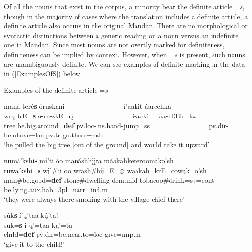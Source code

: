 Of all the nouns that exist in the corpus, a minority bear the definite article =\textit{s}, though in the majority of cases where the translation includes a definite article, a definite article also occurs in the original Mandan. There are no morphological or syntactic distinctions between a generic reading on a noun versus an indefinite one in Mandan. Since most nouns are not overtly marked for definiteness, definiteness can be implied by context. However, when =\textit{s} is present, such nouns are unambiguously definite. We can see examples of definite marking in the data in (\ref{ExamplesOfS}) below.

\begin{exe}

\item\label{ExamplesOfS} Examples of the definite article =\textit{s}

\begin{xlist}

\item\label{ExamplesOfS1} \glll maná teré\textbf{s} óruskani ~ ~ ~ ~ ~ ~ ~ ~ ~ ~ í'aakit áareehka\\
    wrą trE=\textbf{s} o-ru-skE=rį ~ ~ ~ ~ ~ ~ ~ ~ ~ ~ i-aaki=t aa-rEEh=ka\\
    \textnormal{tree} \textnormal{be.big.around}=\textbf{def} pv.loc-ins.hand-\textnormal{jump}=ss ~ ~ ~ ~ ~ ~ ~ ~ ~ ~ pv.dir-\textnormal{be.above}=loc pv.tr-\textnormal{go.there}=hab\\
    \glt `he pulled the big tree [out of the ground] and would take it upward' \citep[21]{hollow1973a}

\item\label{ExamplesOfS2} \glll numá'kshi\textbf{s} mí'ti óo manáshhįįra máakahkereroomako'sh\\
ruwą'kshi=\textbf{s} wį'\#ti oo wrąsh\#hįį=E=$\varnothing$ wąąkah=krE=oowąk=o'sh\\
    \textnormal{man}\#\textnormal{be.good}=\textbf{def} \textnormal{stone}\#\textnormal{dwelling} dem.mid \textnormal{tobacoo}\#\textnormal{drink}=sv=cont \textnormal{be.lying}.aux.hab=3pl=narr=ind.m\\
    \glt `they were always there smoking with the village chief there' \citep[230]{hollow1973b}
    
\item\label{ExamplesOfS3} \glll súk\textbf{s} í'ų'taa kų́'ta!\\
    suk=\textbf{s} i-ų'=taa kų'=ta\\
    \textnormal{child}=\textbf{def} pv.dir=\textnormal{be.near.to}=loc \textnormal{give}=imp.m\\
    \glt `give it to the child!' \citep[25]{kennard1936}


\end{xlist}
\end{exe}
